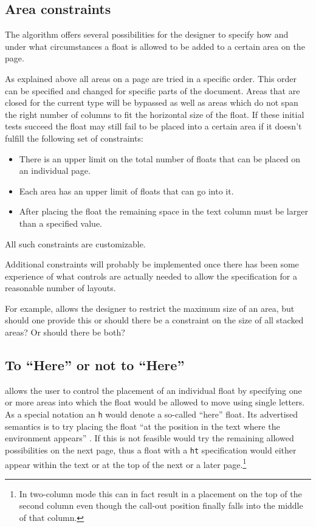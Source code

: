 \documentclass[twocolumn]{article}
\begin{document}


\subsection{Area constraints}

The algorithm offers several possibilities for the designer to
specify how and under what circumstances a float is allowed to be
added to a certain area on the page.

As explained above all areas on a page are tried in a specific
order. This order can be specified and changed for specific parts of
the document. Areas that are closed for the current type will be
bypassed as well as areas which do not span the right number of
columns to fit the horizontal size of the float. If these initial
tests succeed the float may still fail to be placed into a certain
area if it doesn't fulfill the following set of constraints:
\begin{itemize}
\item There is an upper limit on the total number of floats that can
be placed on an individual page.
\item Each area has an upper limit of floats that can go into it.
\item After placing the float the remaining space in the text column
must be larger than a specified value.
\end{itemize}
All such constraints are customizable.

Additional constraints will probably be implemented
once there has been some experience of what controls are actually
needed to allow the specification for a reasonable number of layouts.

For example, \LaTeXe{} allows the designer to restrict the maximum size of
an area, but should one provide this or should there be a constraint
on the size of all stacked areas? Or should there be both?



\subsection{To ``Here'' or not to ``Here''}

\LaTeXe{} allows the user to control the placement of an individual float by
specifying one or more areas into which the float would be
allowed to move using single letters. As a special notation an
\texttt{h} would denote a so-called ``here'' float. Its advertised
semantics is to try placing the float ``at the position in the text
where the environment appears'' \cite[p.~197]{A-W:LLa94}.
If this is not feasible \LaTeXe{} would try the remaining
allowed possibilities on the next page, thus a float with a
\texttt{ht} specification  would either appear within the text or
at the top of the next or a later
page.\footnote{ In two-column mode
this can in fact result in a placement on the top of the second column
even though the call-out position finally falls into the middle of
that column.}
\end{document}
